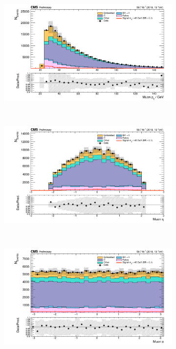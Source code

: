 \begin{figure}[ht]
    \centering
    \begin{subfigure}{0.75\textwidth}
        \includegraphics[width=1.0\textwidth]{figures/ch-11-asymmetric/mutau_pt_1.png}
    \end{subfigure} \\
    \begin{subfigure}{0.75\textwidth}
        \includegraphics[width=1.0\textwidth]{figures/ch-11-asymmetric/mutau_eta_1.png}
    \end{subfigure} \\
    \begin{subfigure}{0.75\textwidth}
        \includegraphics[width=1.0\textwidth]{figures/ch-11-asymmetric/mutau_phi_1.png}

\end{subfigure}
\end{figure}
